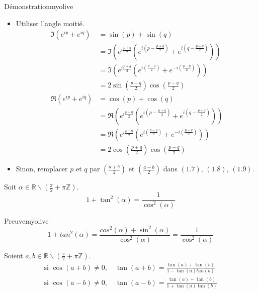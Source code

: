     \begin{demo}{Démonstration}{myolive}
        \begin{itemize}[label=\textcolor{myolive}{$\star$}]
        \item Utiliser l’angle moitié.
            \begin{align*}
            \Im(e^{ip} + e^{iq}) & = \sin(p) + \sin(q) \\
            & = \Im \left(e^{i\frac{p+q}{2}} \left( e^{i (p - \frac{p+q}{2})} + e^{i(q - \frac{p+q}{2})} \right)\right) \\
            & = \Im \left(e^{i\frac{p+q}{2}} \left( e^{i (\frac{p-q}{2})} + e^{-i(\frac{p-q}{2})} \right)\right) \\
            & = 2 \sin\left(\frac{p+q}{2}\right) \cos\left(\frac{p-q}{2}\right) \\
            \Re(e^{ip} + e^{iq}) & = \cos(p) + \cos(q) \\
            & = \Re \left(e^{i\frac{p+q}{2}} \left( e^{i (p - \frac{p+q}{2})} + e^{i(q - \frac{p+q}{2})} \right)\right) \\
            & = \Re \left(e^{i\frac{p+q}{2}} \left( e^{i (\frac{p-q}{2})} + e^{-i(\frac{p-q}{2})} \right)\right) \\
            & = 2 \cos\left(\frac{p+q}{2}\right) \cos\left(\frac{p-q}{2}\right)
            \end{align*}
        \item Sinon, remplacer $p$ et $q$ par $\left( \frac{a + b}{2} \right)$ et $\left( \frac{a - b}{2} \right)$ dans $(1.7)$, $(1.8)$, $(1.9)$.
        \end{itemize}
    \end{demo}

    \begin{prop}{}{}
        Soit $\alpha \in \mathbb{R} \backslash \left(\frac{\pi}{2} + \pi \mathbb{Z}\right)$.
        \[ 1 + \tan^2(\alpha) = \frac{1}{\cos^2(\alpha)} \] 
    \end{prop}

    \begin{demo}{Preuve}{myolive}
        \[ 1 + tan^2(\alpha) = \frac{cos^2(\alpha) + \sin^2(\alpha)}{\cos^2(\alpha)} = \frac{1}{\cos^2(\alpha)} \]
    \end{demo}

    \begin{prop}{}{}
        Soient $a,b \in \mathbb{R} \backslash \left(\frac{\pi}{2} + \pi \mathbb{Z}\right)$.
        \begin{align}
            \text{si } \cos(a+b) \neq 0, \quad  \tan(a + b) = \frac{\tan(a) + \tan(b)}{1 - \tan(a)tan(b)} \\
            \text{si } \cos(a-b) \neq 0, \quad \tan(a - b) = \frac{\tan(a) - \tan(b)}{1 + \tan(a)\tan(b)}
        \end{align}
    \end{prop}

